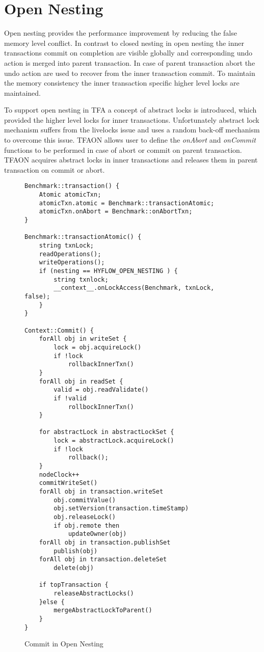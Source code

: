 \documentclass[12pt,english]{report}
\begin{document}
\section{Open Nesting}

Open nesting provides the performance improvement by reducing the false memory level conflict. In contrast to closed nesting in open nesting the inner transactions commit on completion are visible globally and corresponding undo action is merged into parent transaction. In case of parent transaction abort the undo action are used to recover from the inner transaction commit. To maintain the memory consistency the inner transaction specific higher level locks are maintained.  

To support open nesting in TFA a concept of abstract locks is introduced, which provided the higher level locks for inner transactions. Unfortunately abstract lock mechanism suffers from the livelocks issue and uses a random back-off mechanism to overcome this issue. TFAON allows user to define the \textit{onAbort} and \textit{onCommit} functions to be performed in case of abort or commit on parent transaction. TFAON acquires abstract locks in inner transactions and releases them in parent transaction on commit or abort. 

\begin{figure}
\begin{minipage}[b]{0.9\linewidth}\centering
\begin{lstlisting}
Benchmark::transaction() {
	Atomic atomicTxn;
	atomicTxn.atomic = Benchmark::transactionAtomic;
	atomicTxn.onAbort = Benchmark::onAbortTxn;
}

Benchmark::transactionAtomic() {
    string txnLock;
	readOperations();
	writeOperations();
	if (nesting == HYFLOW_OPEN_NESTING ) {
		string txnlock;
		__context__.onLockAccess(Benchmark, txnLock, false);	
	}
}	

Context::Commit() {
	forAll obj in writeSet {
		lock = obj.acquireLock()
		if !lock
			rollbackInnerTxn()
	}
	forAll obj in readSet {
		valid = obj.readValidate()
		if !valid
			rollbockInnerTxn()
	}
	
	for abstractLock in abstractLockSet {
		lock = abstractLock.acquireLock()
		if !lock
			rollback();
	}
	nodeClock++
	commitWriteSet()
	forAll obj in transaction.writeSet
		obj.commitValue()
 		obj.setVersion(transaction.timeStamp)
 		obj.releaseLock()
 		if obj.remote then
 			updateOwner(obj)
	forAll obj in transaction.publishSet
		publish(obj)
	forAll obj in transaction.deleteSet
		delete(obj)
		
	if topTransaction {
		releaseAbstractLocks()
	}else {
		mergeAbstractLockToParent()
	}	
}
\end{lstlisting}
\end{minipage}
\caption{Commit in Open Nesting}
\label{Fig:OpenNestingCommit}
\end{figure}
\end{document}
